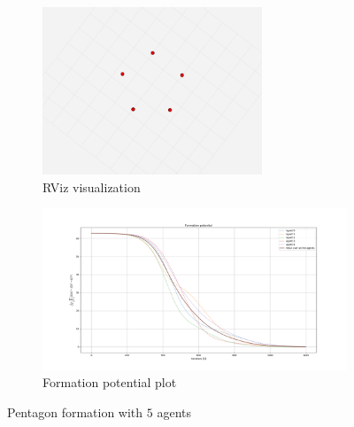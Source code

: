 \documentclass[a4paper,11pt,oneside]{book}
\begin{document}
\begin{figure}[h]
\centering
	\begin{subfigure}{0.49\textwidth}	
	\centering
	\includegraphics[width=0.72\textwidth]{pentagon_rviz}
	\caption{RViz visualization}
	\end{subfigure}
\hfill
	\begin{subfigure}{0.49\textwidth}	
	\includegraphics[width=1.2\textwidth]{Task-2.2_Formation-p_No-Coll-Avoid_Pentagon}
	\caption{Formation potential plot}
	\end{subfigure}
\caption{Pentagon formation with $5$ agents}
\label{Pentagon}
\end{figure}
\end{document}
